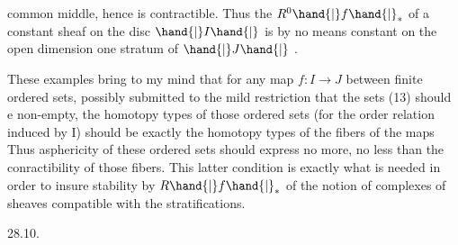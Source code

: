 common middle, hence is contractible. Thus the $R^{0}\hand{|}f\hand{|}_{*}$ of a constant
sheaf on the disc $\hand{|}I\hand{|}$ is by no means constant on the open\hand{,} dimension one
stratum of $\hand{|}J\hand{|}$ .

These examples bring to my mind that for any map $f: I \to J$ between
finite ordered sets,  possibly submitted to the mild
restriction that the sets (13) should e non-empty, the homotopy types
of those  ordered sets (for the order relation induced by I) should
be exactly the homotopy types of the fibers of the maps 
Thus asphericity of these ordered sets should express no more, no less
than the conractibility of those fibers.\deleted{(} This latter condition is
exactly what is needed in order to insure stability by $R\hand{|}f\hand{|}_{*}$ of the
notion of complexes of sheaves compatible with the stratifications.

28.10.

